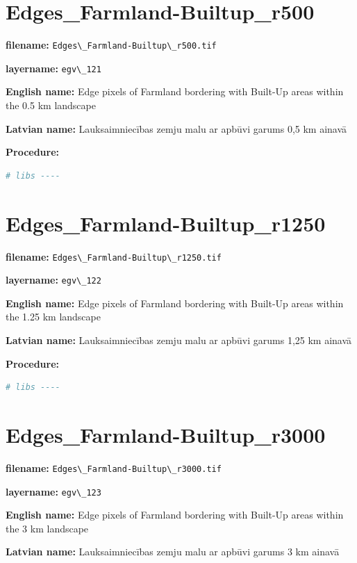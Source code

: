 \documentclass[
]{book}
\newcommand{\passthrough}[1]{#1}
\begin{document}
\section{Edges\_Farmland-Builtup\_r500}\label{ch06.121}

\textbf{filename:} \passthrough{\lstinline!Edges\_Farmland-Builtup\_r500.tif!}

\textbf{layername:} \passthrough{\lstinline!egv\_121!}

\textbf{English name:} Edge pixels of Farmland bordering with Built-Up areas within the 0.5 km landscape

\textbf{Latvian name:} Lauksaimniecības zemju malu ar apbūvi garums 0,5 km ainavā

\textbf{Procedure:}

\begin{lstlisting}[language=R]
# libs ----
\end{lstlisting}

\section{Edges\_Farmland-Builtup\_r1250}\label{ch06.122}

\textbf{filename:} \passthrough{\lstinline!Edges\_Farmland-Builtup\_r1250.tif!}

\textbf{layername:} \passthrough{\lstinline!egv\_122!}

\textbf{English name:} Edge pixels of Farmland bordering with Built-Up areas within the 1.25 km landscape

\textbf{Latvian name:} Lauksaimniecības zemju malu ar apbūvi garums 1,25 km ainavā

\textbf{Procedure:}

\begin{lstlisting}[language=R]
# libs ----
\end{lstlisting}

\section{Edges\_Farmland-Builtup\_r3000}\label{ch06.123}

\textbf{filename:} \passthrough{\lstinline!Edges\_Farmland-Builtup\_r3000.tif!}

\textbf{layername:} \passthrough{\lstinline!egv\_123!}

\textbf{English name:} Edge pixels of Farmland bordering with Built-Up areas within the 3 km landscape

\textbf{Latvian name:} Lauksaimniecības zemju malu ar apbūvi garums 3 km ainavā
\end{document}
